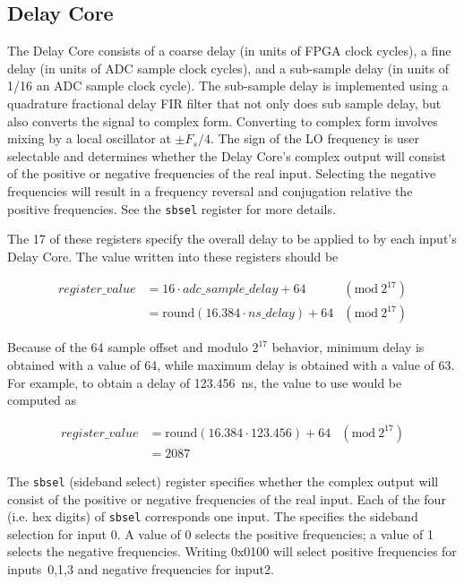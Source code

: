 \documentclass[12pt]{article}
\begin{document}
  \subsection{Delay Core}

The Delay Core consists of a coarse delay (in units of FPGA clock cycles), a
fine delay (in units of ADC sample clock cycles), and a sub-sample delay (in
units of 1/16 an ADC sample clock cycle).  The sub-sample delay is implemented
using a quadrature fractional delay FIR filter that not only does sub sample
delay, but also converts the signal to complex form.  Converting to complex
form involves mixing by a local oscillator at $\pm F_s/4$.  The sign of the LO
frequency is user selectable and determines whether the Delay Core's complex
output will consist of the positive or negative frequencies of the real input.
Selecting the negative frequencies will result in a frequency reversal and
conjugation relative the positive frequencies.  See the \verb|sbsel| register
for more details.

\begin{description}

\filbreak
{}
 The 17 \LSbs of these registers specify the overall delay to be
applied to by each input's Delay Core.  The value written into these registers
should be

\begin{align*}
register\_value &= 16 \cdot adc\_sample\_delay + 64 &(\mathrm{mod}\:2^{17}) \\
                &= \mathrm{round}(16.384 \cdot ns\_delay) + 64 &(\mathrm{mod}\:2^{17})
\end{align*}

Because of the 64 sample offset and modulo $2^{17}$ behavior, minimum delay is
obtained with a value of 64, while maximum delay is obtained with a value of
63.  For example, to obtain a delay of 123.456~ns, the value to use would be
computed as

\begin{align*}
register\_value &= \mathrm{round}(16.384 \cdot 123.456) + 64 &(\mathrm{mod}\:2^{17}) \\
                &= 2087
\end{align*}

\end{description}

\begin{description}

 The \verb|sbsel| (sideband select) register specifies whether the
complex output will consist of the positive or negative frequencies of the real
input.  Each of the four \LSns (i.e. hex digits) of \verb|sbsel| corresponds
one input.  The \LSn specifies the sideband selection for input 0.  A value of
0 selects the positive frequencies; a value of 1 selects the negative
frequencies.  Writing 0x0100 will select positive frequencies for inputs~0,1,3
and negative frequencies for input2.

\end{description}
\end{document}
